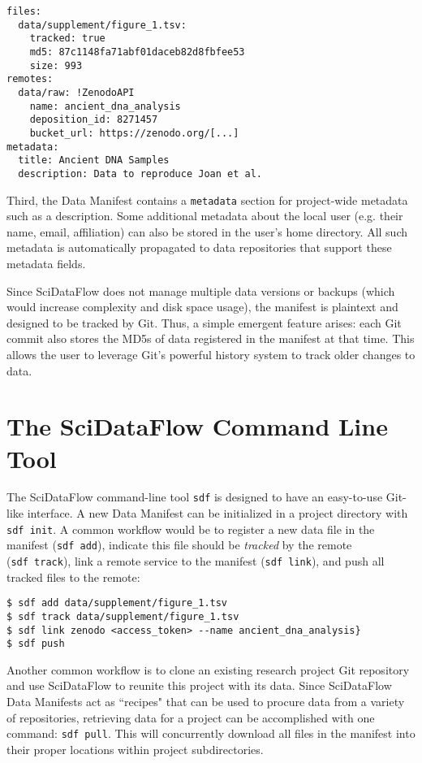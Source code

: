 \documentclass[unnumsec,webpdf,contemporary,large]{oup-authoring-template}%
\theoremstyle{thmstyleone}%
\theoremstyle{thmstyletwo}%
\theoremstyle{thmstylethree}%
\begin{document}
\begin{minipage}{\hsize}
\footnotesize
\begin{lstlisting}
files:
  data/supplement/figure_1.tsv:
    tracked: true
    md5: 87c1148fa71abf01daceb82d8fbfee53
    size: 993
remotes:
  data/raw: !ZenodoAPI
    name: ancient_dna_analysis
    deposition_id: 8271457
    bucket_url: https://zenodo.org/[...]
metadata:
  title: Ancient DNA Samples
  description: Data to reproduce Joan et al.
\end{lstlisting}
\end{minipage}

Third, the Data Manifest contains a \texttt{metadata} section for
project-wide metadata such as a description. Some additional metadata
about the local user (e.g. their name, email, affiliation) can also be
stored in the user's home directory. All such metadata is automatically
propagated to data repositories that support these metadata fields.

Since SciDataFlow does not manage multiple data versions or backups
(which would increase complexity and disk space usage), the manifest is
plaintext and designed to be tracked by Git. Thus, a simple emergent
feature arises: each Git commit also stores the MD5s of data registered
in the manifest at that time. This allows the user to leverage Git's
powerful history system to track older changes to data.

\section{The SciDataFlow Command Line Tool}\label{sec3}

The SciDataFlow command-line tool \texttt{sdf} is designed to have an
easy-to-use Git-like interface. A new Data Manifest can be initialized
in a project directory with \texttt{sdf\ init}. A common workflow would
be to register a new data file in the manifest (\texttt{sdf\ add}),
indicate this file should be \emph{tracked} by the remote
(\texttt{sdf\ track}), link a remote service to the manifest
(\texttt{sdf\ link}), and push all tracked files to the remote:

\begin{verbatim}
$ sdf add data/supplement/figure_1.tsv
$ sdf track data/supplement/figure_1.tsv
$ sdf link zenodo <access_token> --name ancient_dna_analysis}
$ sdf push
\end{verbatim}

Another common workflow is to clone an existing research project Git
repository and use SciDataFlow to reunite this project with its data.
Since SciDataFlow Data Manifests act as ``recipes" that can be used
to procure data from a variety of repositories, retrieving data for a 
project can be accomplished with one command: \texttt{sdf pull}. This will
concurrently download all files in the manifest into their proper
locations within project subdirectories.
\end{document}
